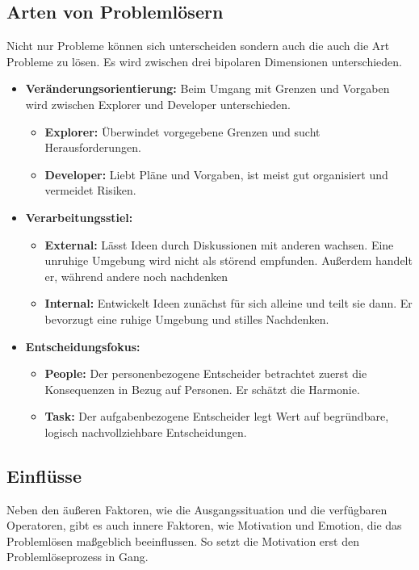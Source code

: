 \subsection{Arten von Problemlösern}
Nicht nur Probleme können sich unterscheiden sondern auch die auch die Art Probleme zu lösen. Es wird zwischen drei bipolaren Dimensionen unterschieden. \cite{Betsch2011}
\begin{itemize}
\item \textbf{Veränderungsorientierung:} Beim Umgang mit Grenzen und Vorgaben wird zwischen Explorer und Developer unterschieden.
	\begin{itemize}
	\item \textbf{Explorer:} Überwindet vorgegebene Grenzen und sucht Herausforderungen.
	\item \textbf{Developer:} Liebt Pläne und Vorgaben, ist meist gut organisiert und vermeidet Risiken.
	\end{itemize}
\item \textbf{Verarbeitungsstiel:}
	\begin{itemize}
	\item \textbf{External:} Lässt Ideen durch Diskussionen mit anderen wachsen. Eine unruhige Umgebung wird nicht als störend empfunden. Außerdem handelt er, während andere noch nachdenken
	\item \textbf{Internal:} Entwickelt Ideen zunächst für sich alleine und teilt sie dann. Er bevorzugt eine ruhige Umgebung und stilles Nachdenken.
	\end{itemize}
\item \textbf{Entscheidungsfokus:}
	\begin{itemize}
	\item \textbf{People:} Der personenbezogene Entscheider betrachtet zuerst die Konsequenzen in Bezug auf Personen. Er schätzt die Harmonie.
	\item \textbf{Task:} Der aufgabenbezogene Entscheider legt Wert auf begründbare, logisch nachvollziehbare Entscheidungen.
	\end{itemize}
\end{itemize}

\subsection{Einflüsse}
Neben den äußeren Faktoren, wie die Ausgangssituation und die verfügbaren Operatoren, gibt es auch innere Faktoren, wie Motivation und Emotion, die das Problemlösen maßgeblich beeinflussen. So setzt die Motivation erst den Problemlöseprozess in Gang.  \cite{Dorner1984}

